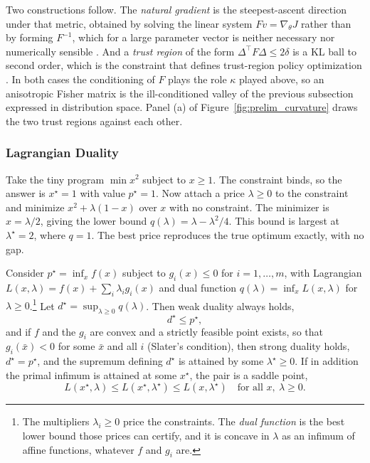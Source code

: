 Two constructions follow. The \emph{natural gradient} is the steepest-ascent direction under that metric, obtained by solving the linear system $F v = \nabla_\theta J$ rather than by forming $F^{-1}$, which for a large parameter vector is neither necessary nor numerically sensible \citep{amari1998natural, Kakade2001}. And a \emph{trust region} of the form $\Delta^\top F \Delta \leq 2\delta$ is a KL ball to second order, which is the constraint that defines trust-region policy optimization \citep{Schulman2015}. In both cases the conditioning of $F$ plays the role $\kappa$ played above, so an anisotropic Fisher matrix is the ill-conditioned valley of the previous subsection expressed in distribution space. Panel (a) of Figure~\ref{fig:prelim_curvature} draws the two trust regions against each other.

\subsubsection{Lagrangian Duality}

Take the tiny program $\min x^2$ subject to $x \geq 1$. The constraint binds, so the answer is $x^\star = 1$ with value $p^\star = 1$. Now attach a price $\lambda \geq 0$ to the constraint and minimize $x^2 + \lambda(1 - x)$ over $x$ with no constraint. The minimizer is $x = \lambda/2$, giving the lower bound $q(\lambda) = \lambda - \lambda^2/4$. This bound is largest at $\lambda^\star = 2$, where $q = 1$. The best price reproduces the true optimum exactly, with no gap.

\begin{theorem}
\label{thm:prelim_duality}
Consider $p^\star = \inf_x f(x)$ subject to $g_i(x) \leq 0$ for $i = 1, \ldots, m$, with Lagrangian $L(x, \lambda) = f(x) + \sum_i \lambda_i g_i(x)$ and dual function $q(\lambda) = \inf_x L(x, \lambda)$ for $\lambda \geq 0$.\footnote{The multipliers $\lambda_i \geq 0$ price the constraints. The \emph{dual function} is the best lower bound those prices can certify, and it is concave in $\lambda$ as an infimum of affine functions, whatever $f$ and $g_i$ are.} Let $d^\star = \sup_{\lambda \geq 0} q(\lambda)$. Then weak duality always holds,
\begin{equation}
d^\star \leq p^\star,
\label{eq:prelim_weak_duality}
\end{equation}
and if $f$ and the $g_i$ are convex and a strictly feasible point exists, so that $g_i(\bar x) < 0$ for some $\bar x$ and all $i$ (Slater's condition), then strong duality holds, $d^\star = p^\star$, and the supremum defining $d^\star$ is attained by some $\lambda^\star \geq 0$. If in addition the primal infimum is attained at some $x^\star$, the pair is a saddle point,
\begin{equation}
L(x^\star, \lambda) \leq L(x^\star, \lambda^\star) \leq L(x, \lambda^\star) \quad \text{for all } x, \ \lambda \geq 0.
\label{eq:prelim_saddle}
\end{equation}
\end{theorem}

